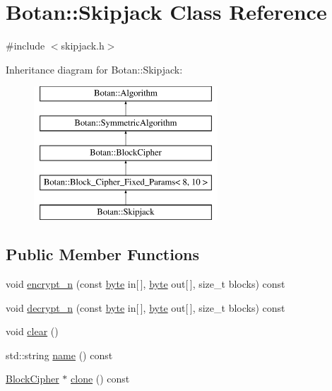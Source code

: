 \hypertarget{classBotan_1_1Skipjack}{\section{Botan\-:\-:Skipjack Class Reference}
\label{classBotan_1_1Skipjack}
}


{\ttfamily \#include $<$skipjack.\-h$>$}

Inheritance diagram for Botan\-:\-:Skipjack\-:\begin{figure}[H]
\begin{center}
\leavevmode
\includegraphics[height=5.000000cm]{classBotan_1_1Skipjack}
\end{center}
\end{figure}
\subsection*{Public Member Functions}
\begin{DoxyCompactItemize}
\item 
void \hyperlink{classBotan_1_1Skipjack_a15587bcc9526042ce784565672f8e07d}{encrypt\-\_\-n} (const \hyperlink{namespaceBotan_a7d793989d801281df48c6b19616b8b84}{byte} in\mbox{[}$\,$\mbox{]}, \hyperlink{namespaceBotan_a7d793989d801281df48c6b19616b8b84}{byte} out\mbox{[}$\,$\mbox{]}, size\-\_\-t blocks) const 
\item 
void \hyperlink{classBotan_1_1Skipjack_ad6e909b03153b81d69a2eec39416cf1d}{decrypt\-\_\-n} (const \hyperlink{namespaceBotan_a7d793989d801281df48c6b19616b8b84}{byte} in\mbox{[}$\,$\mbox{]}, \hyperlink{namespaceBotan_a7d793989d801281df48c6b19616b8b84}{byte} out\mbox{[}$\,$\mbox{]}, size\-\_\-t blocks) const 
\item 
void \hyperlink{classBotan_1_1Skipjack_afbf2687b517adc25eb9982069607ce47}{clear} ()
\item 
std\-::string \hyperlink{classBotan_1_1Skipjack_ad9a88ae5f456b4814e1a8b4b45585f3e}{name} () const 
\item 
\hyperlink{classBotan_1_1BlockCipher}{Block\-Cipher} $\ast$ \hyperlink{classBotan_1_1Skipjack_a4e3f3370264c9305706f96823bc1ff27}{clone} () const 
\end{DoxyCompactItemize}
